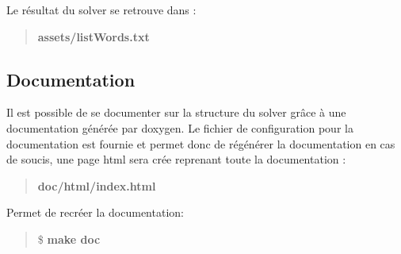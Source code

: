 Le résultat du solver se retrouve dans \+:

\begin{quote}
{\bfseries assets/list\+Words.\+txt} \end{quote}


\subsection*{Documentation}

Il est possible de se documenter sur la structure du solver grâce à une documentation générée par doxygen. Le fichier de configuration pour la documentation est fournie et permet donc de régénérer la documentation en cas de soucis, une page html sera crée reprenant toute la documentation \+:

\begin{quote}
{\bfseries doc/html/index.\+html} \end{quote}


Permet de recréer la documentation\+:

\begin{quote}
\$ {\bfseries make doc}\end{quote}

